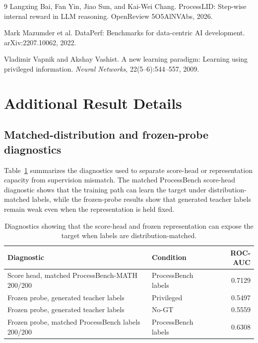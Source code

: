 \documentclass{article}
\begin{document}
\begin{thebibliography}{9}
Langxing Bai, Fan Yin, Jiao Sun, and Kai-Wei Chang.
\newblock ProcessLID: Step-wise internal reward in LLM reasoning.
\newblock OpenReview 5O5AlNVAbs, 2026.

Mark Mazumder et al.
\newblock DataPerf: Benchmarks for data-centric AI development.
\newblock arXiv:2207.10062, 2022.

Vladimir Vapnik and Akshay Vashist.
\newblock A new learning paradigm: Learning using privileged information.
\newblock \emph{Neural Networks}, 22(5--6):544--557, 2009.

\end{thebibliography}

\appendix

\section{Additional Result Details}

\subsection{Matched-distribution and frozen-probe diagnostics}

Table~\ref{tab:diagnostics} summarizes the diagnostics used to separate score-head or representation capacity from supervision mismatch.
The matched ProcessBench score-head diagnostic shows that the training path can learn the target under distribution-matched labels, while the frozen-probe results show that generated teacher labels remain weak even when the representation is held fixed.

\begin{table}[h]
\centering
\small
\begin{tabular}{llr}
\toprule
Diagnostic & Condition & ROC-AUC \\
\midrule
Score head, matched ProcessBench-MATH 200/200 & ProcessBench labels & 0.7129 \\
Frozen probe, generated teacher labels & Privileged & 0.5497 \\
Frozen probe, generated teacher labels & No-GT & 0.5559 \\
Frozen probe, matched ProcessBench labels 200/200 & ProcessBench labels & 0.6308 \\
\bottomrule
\end{tabular}
\caption{Diagnostics showing that the score-head and frozen representation can expose the target when labels are distribution-matched.}
\label{tab:diagnostics}
\end{table}
\end{document}
